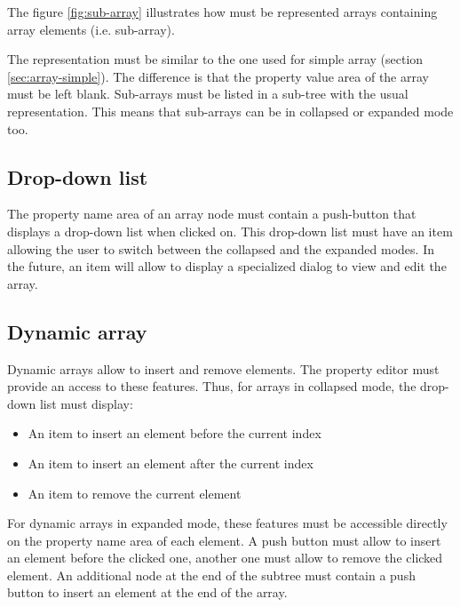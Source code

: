 \documentclass[a4paper, twoside]{report}
\begin{document}
The figure \ref{fig:sub-array} illustrates how must be represented arrays containing array elements
(i.e. sub-array).

The representation must be similar to the one used for simple array (section
\ref{sec:array-simple}). The difference is that the property value area of the array must be left
blank. Sub-arrays must be listed in a sub-tree with the usual representation. This means that
sub-arrays can be in collapsed or expanded mode too.


\subsection{Drop-down list\label{sec:array-dropdownlist}}

The property name area of an array node must contain a push-button that displays a drop-down list
when clicked on. This drop-down list must have an item allowing the user to switch between the collapsed and
the expanded modes. In the future, an item will allow to display a specialized dialog to view and
edit the array.

\subsection{Dynamic array\label{sec:array-dynamic}}

Dynamic arrays allow to insert and remove elements. The property editor must provide an access to
these features. Thus, for arrays in collapsed mode, the drop-down list must display:
\begin{itemize}
    \item An item to insert an element before the current index
    \item An item to insert an element after the current index
    \item An item to remove the current element
\end{itemize}

For dynamic arrays in expanded mode, these features must be accessible directly on the property name
area of each element. A push button must allow to insert an element before the clicked one, another
one must allow to remove the clicked element. An additional node at the end of the subtree must contain a push button to insert an element at the end of the array.
\end{document}
